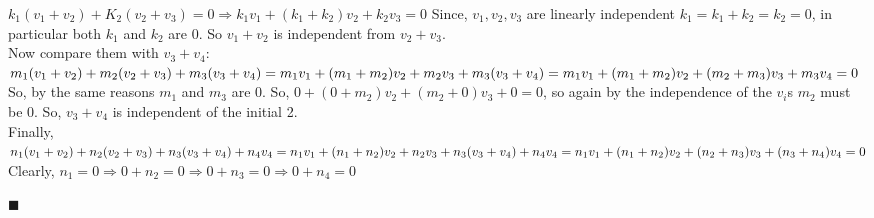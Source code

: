 \documentclass{article}
\begin{document}
$k_1(v_1+v_2) + K_2(v_2+v_3) =0 \Rightarrow k_1v_1+ (k_1 + k_2)v_2 + k_2v_3 =0$
Since, $v_1,v_2,v_3$ are linearly independent $k_1=k_1+k_2=k_2=0$, in
particular both $k_1$ and $k_2$ are $0$. So $v_1+v_2$ is independent from
$v_2+v_3$.\\
Now compare them with $v_3+v_4$:\\
$m_1(v_1+v_2) + m_2(v_2+v_3) + m_3(v_3+v_4)= m_1v_1+ (m_1 + m_2)v_2 +
m_2v_3 + m_3(v_3+v_4)
\\= m_1v_1+ (m_1 + m_2)v_2 +
(m_2+m_3)v_3 + m_3v_4 = 0$\\
So, by the same reasons  $m_1$ and $m_3$ are $0$. So,
$0+(0+m_2)v_2+(m_2+0)v_3+0 =0$, so again by the independence of the
$v_i$s $m_2$ must be $0$. So, $v_3+v_4$ is independent of the initial
2.\\
Finally,
$n_1(v_1+v_2) + n_2(v_2+v_3) + n_3(v_3+v_4) +n_4v_4= n_1v_1+ (n_1 + n_2)v_2 +
n_2v_3 + n_3(v_3+v_4) +n_4v_4
\\= n_1v_1+ (n_1 + n_2)v_2 +
(n_2+n_3)v_3 + (n_3 + n_4)v_4= 0$\\
Clearly, $n_1=0 \Rightarrow 0+n_2 = 0 \Rightarrow 0+n_3 = 0
\Rightarrow 0+n_4 =0$\\
\begin{flushright}$\blacksquare$\end{flushright}\\
\end{document}

